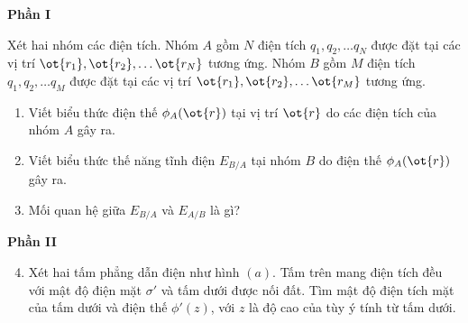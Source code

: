 \begin{vd}
\begin{center}
    \bf Phần I
\end{center}
Xét hai nhóm các điện tích. Nhóm $A$ gồm $N$ điện tích $q_1, q_2,\dots q_{N}$ được đặt tại các vị trí $\ot{r_1}, \ot{r_2}, \dots \ot{r_{N}}$ tương ứng. Nhóm $B$ gồm $M$ điện tích $q_1, q_2,\dots q_{M}$ được đặt tại các vị trí $\ot{r_1}, \ot{r_2}, \dots \ot{r_{M}}$ tương ứng.
\begin{enumerate}[1)]
    \item Viết biểu thức điện thế $\phi_{A}(\ot{r})$ tại vị trí $\ot{r}$ do các điện tích của nhóm $A$ gây ra.
    \item Viết biểu thức thế năng tĩnh điện $E_{B/A}$ tại nhóm $B$ do điện thế  $\phi_{A}(\ot{r})$ gây ra.
    \item Mối quan hệ giữa $E_{B/A}$ và $E_{A/B}$ là gì?
    \end{enumerate}
    \begin{center}
        \bf Phần II
    \end{center}
\begin{enumerate}[1)]
\setcounter{enumi}{3}
    \item Xét hai tấm phẳng dẫn điện như hình $(a)$. Tấm trên mang điện tích đều với mật độ điện mặt $\sigma'$ và tấm dưới được nối đất. Tìm mật độ điện tích mặt của tấm dưới và điện thế $\phi'(z)$, với $z$ là độ cao của tùy ý tính từ tấm dưới.
    \begin{center}

\begin{tikzpicture}[x=0.75pt,y=0.75pt,yscale=-1,xscale=1]


\end{tikzpicture}
\end{center}
\end{enumerate}
\end{vd}
